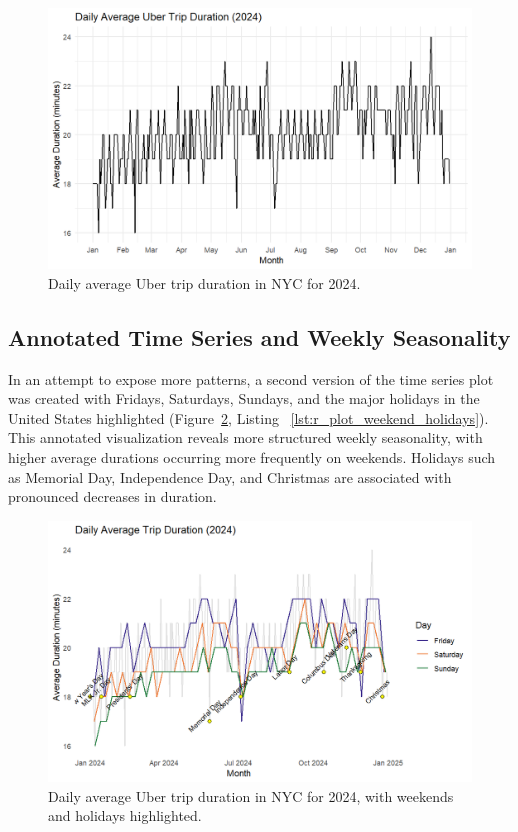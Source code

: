 \documentclass{article}
\begin{document}
\begin{figure}
  \includegraphics[width=\textwidth]{avg_trip_duration_simple.png}
  \caption{Daily average Uber trip duration in NYC for 2024.}
  \label{fig:initial_plot}
\end{figure}

\subsection{Annotated Time Series and Weekly Seasonality}
In an attempt to expose more patterns, a second version of the time series plot was created with Fridays, Saturdays, Sundays, and the major holidays in the United States highlighted (Figure~\ref{fig:timeseries_plot}, Listing ~\ref{lst:r_plot_weekend_holidays}). This annotated visualization reveals more structured weekly seasonality, with higher average durations occurring more frequently on weekends. Holidays such as Memorial Day, Independence Day, and Christmas are associated with pronounced decreases in duration.

\begin{figure}
  \includegraphics[width=\textwidth]{avg_trip_duration_by_day.png}
  \caption{Daily average Uber trip duration in NYC for 2024, with weekends and holidays highlighted.}
  \label{fig:timeseries_plot}
\end{figure}
\end{document}
